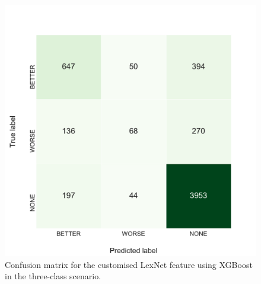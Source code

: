 \begin{figure}[h]
\begin{minipage}{.5\linewidth}
     \caption{Confusion matrix for the customised LexNet feature using XGBoost in the three-class scenario.} 
       \label{fig:3_conf_uni}
 \centering
	\includegraphics[width=1\linewidth]{images/experiments/conf-middle_paths_unrestricted_16_False}
    \end{minipage} 
\end{figure}

